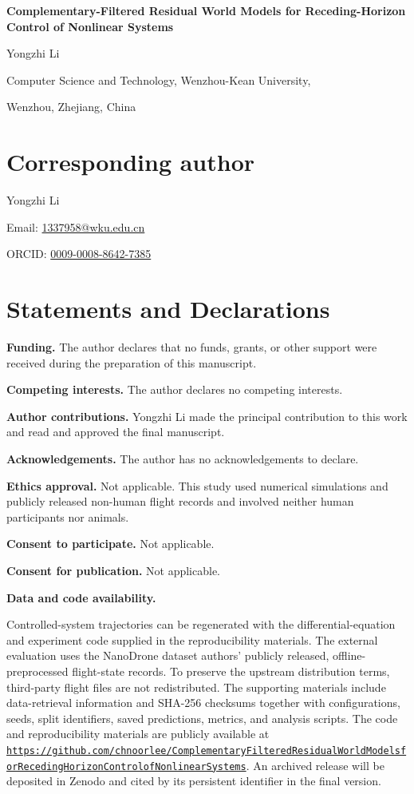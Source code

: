 \documentclass[11pt]{article}
\begin{document}
\begin{center}
{\Large\bfseries Complementary-Filtered Residual World Models for
Receding-Horizon Control of Nonlinear Systems\par}
\vspace{1.3em}
{\large Yongzhi Li\par}
\vspace{0.5em}
Computer Science and Technology, Wenzhou-Kean University,\par
Wenzhou, Zhejiang, China
\end{center}

\section*{Corresponding author}
Yongzhi Li

Email: \href{mailto:1337958@wku.edu.cn}{1337958@wku.edu.cn}

ORCID: \href{https://orcid.org/0009-0008-8642-7385}{0009-0008-8642-7385}

\section*{Statements and Declarations}
\textbf{Funding.} The author declares that no funds, grants, or other support
were received during the preparation of this manuscript.

\textbf{Competing interests.} The author declares no competing interests.

\textbf{Author contributions.} Yongzhi Li made the principal contribution to
this work and read and approved the final manuscript.

\textbf{Acknowledgements.} The author has no acknowledgements to declare.

\textbf{Ethics approval.} Not applicable. This study used numerical
simulations and publicly released non-human flight records and involved neither
human participants nor animals.

\textbf{Consent to participate.} Not applicable.

\textbf{Consent for publication.} Not applicable.

\textbf{Data and code availability.} {\sloppy Controlled-system trajectories
can be regenerated with the differential-equation and experiment code supplied
in the reproducibility materials. The external evaluation uses the NanoDrone
dataset authors' publicly released, offline-preprocessed flight-state
records. To preserve the upstream distribution terms, third-party flight
files are not redistributed. The supporting materials include data-retrieval
information and SHA-256 checksums together with configurations, seeds, split
identifiers, saved predictions, metrics, and analysis scripts. The code and
reproducibility materials are publicly available at
\href{https://github.com/chnoorlee/Complementary-Filtered-Residual-World-Models-for-Receding-Horizon-Control-of-Nonlinear-Systems}{\texttt{https://\allowbreak github.com/\allowbreak chnoorlee/\allowbreak Complementary\-Filtered\-Residual\-World\-Models\-for\-Receding\-Horizon\-Control\-of\-Nonlinear\-Systems}}.
An archived release will be deposited in Zenodo and cited by its persistent
identifier in the final version.\par}
\end{document}

